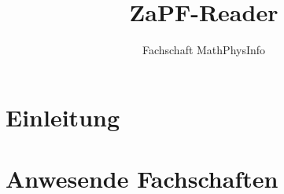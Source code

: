 \documentclass[ngerman, 10pt, openany]{scrbook}
\begin{document}
\title{ZaPF-Reader}
\author{Fachschaft MathPhysInfo}
\maketitle

\tableofcontents


\newpage
\setcounter{tocdepth}{1} %
\small\tableofcontents
\normalsize

\chapter{Einleitung}
  

\chapter{Anwesende Fachschaften}
  

%       
%       
%       
%       
%       
%       
%       
%       
%       

%       
%       
%       
\end{document}
